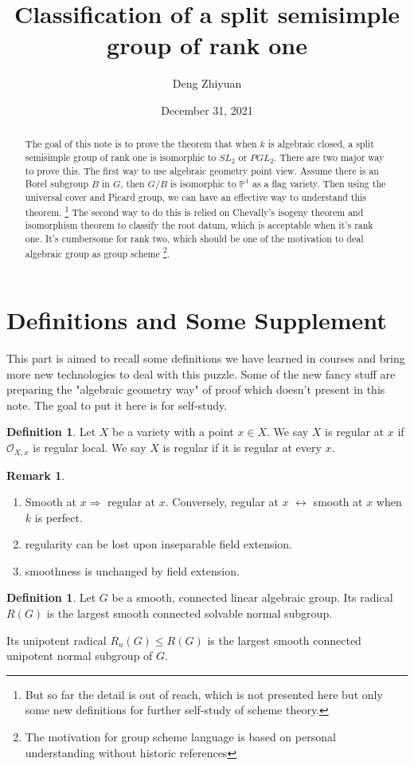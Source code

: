 \documentclass[12pt,a4paper,english]{article}
\title{Classification of a split semisimple group of rank one}
\date{December 31, 2021}
\author{Deng Zhiyuan}
\theoremstyle{plain}
\theoremstyle{definition}
\newtheorem{defi}[thm]{Definition}
\newtheorem*{rem}{Remark}
\begin{document}
\maketitle
\begin{abstract}
    The goal of this note is to prove the theorem that when $k$ is algebraic closed, a split semisimple group of rank one is isomorphic to $SL_{2}$ or $PGL_{2}$. There are two major way to prove this. The first way to use algebraic geometry point view. Assume there is an Borel subgroup $B$ in $G$, then $G/B$ is isomorphic to $\mathbb{P}^{1}$ as a flag variety. Then using the universal cover and Picard group, we can have an effective way to understand this theorem. \footnote{But so far the detail is out of reach, which is not presented here but only some new definitions for further self-study of scheme theory.} The second way to do this is relied on Chevally's isogeny theorem and isomorphism theorem to classify the root datum, which is acceptable when it's rank one. It's cumbersome for rank two, which should be one of the motivation to deal algebraic group as group scheme \footnote{The motivation for group scheme language is based on personal understanding without historic references}.
\end{abstract}
\vspace{0.5cm}


\vspace{0.5cm}

\section{Definitions and Some Supplement}
This part is aimed to recall some definitions we have learned in courses and bring more new technologies to deal with this puzzle. Some of the new fancy stuff are preparing the "algebraic geometry way" of proof which doesn't present in this note. The goal to put it here is for self-study.
\begin{defi}
Let $X$ be a variety with a point $x\in X$. We say $X$ is regular at $x$ if $\mathcal{O}_{X,x}$ is regular local. We say $X$ is regular if it is regular at every $x$.
\end{defi}
\begin{rem}
\begin{enumerate}
    \item Smooth at $x\Rightarrow $ regular at $x$. Conversely, regular at $x$ $\leftrightarrow$ smooth at $x$ when $k$ is perfect\cite{LiuQing2002algebraic}. 
    \item regularity can be lost upon inseparable field extension.
    \item smoothness is unchanged by field extension.
\end{enumerate}
\end{rem}
\begin{defi}
Let $G$ be a smooth, connected linear algebraic group. Its radical $R(G)$ is the largest smooth connected solvable normal subgroup.

Its unipotent radical $R_{u}(G)\leq R(G)$ is the largest smooth connected unipotent normal subgroup of $G$.
\end{defi}
\end{document}
